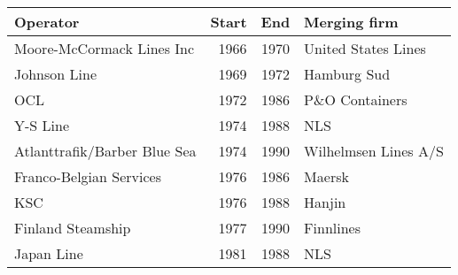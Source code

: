 
\begin{tabular}[t]{lrrl}
\toprule
Operator & Start & End & Merging firm\\
\midrule
Moore-McCormack Lines Inc & 1966 & 1970 & United States Lines\\
Johnson Line & 1969 & 1972 & Hamburg Sud\\
OCL & 1972 & 1986 & P\&O Containers\\
Y-S Line & 1974 & 1988 & NLS\\
Atlanttrafik/Barber Blue Sea & 1974 & 1990 & Wilhelmsen Lines A/S\\
Franco-Belgian Services & 1976 & 1986 & Maersk\\
KSC & 1976 & 1988 & Hanjin\\
Finland Steamship & 1977 & 1990 & Finnlines\\
Japan Line & 1981 & 1988 & NLS\\
\bottomrule
\end{tabular}
